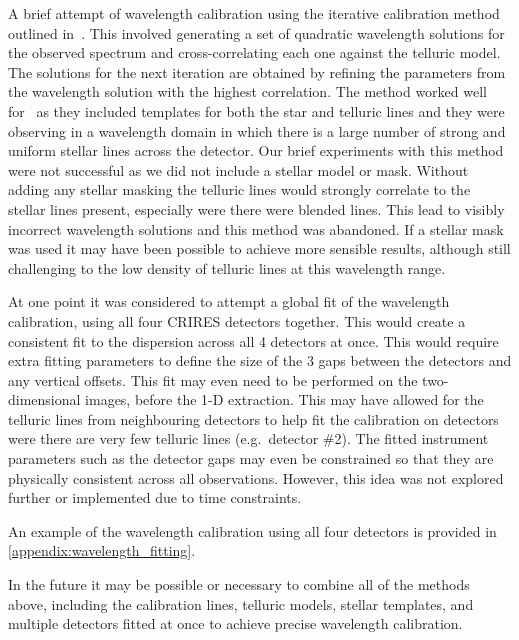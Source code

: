 A brief attempt of wavelength calibration using the iterative calibration method outlined in~\cite{brogi_rotation_2016}.
This involved generating a set of quadratic wavelength solutions for the observed spectrum and cross-correlating each one against the telluric model.
The solutions for the next iteration are obtained by refining the parameters from the wavelength solution with the highest correlation.
The method worked well for~\citet{brogi_rotation_2016} as they included templates for both the star and telluric lines and they were observing in a wavelength domain in which there is a large number of strong and uniform stellar  lines across the detector.
Our brief experiments with this method were not successful as we did not include a stellar model or mask.
Without adding any stellar masking the telluric lines would strongly correlate to the stellar lines present, especially were there were blended lines.
This lead to visibly incorrect wavelength solutions and this method was abandoned.
If a stellar mask was used it may have been possible to achieve more sensible results, although still challenging to the low density of telluric lines at this wavelength range.


At one point it was considered to attempt a global fit of the wavelength calibration, using all four {CRIRES} detectors together.
This would create a consistent fit to the dispersion across all 4 detectors at once.
This would require extra fitting parameters to define the size of the 3 gaps between the detectors and any vertical offsets.
This fit may even need to be performed on the two-dimensional images, before the 1-D extraction.
This may have allowed for the telluric lines from neighbouring detectors to help fit the calibration on detectors were there are very few telluric lines (e.g.\ detector \#2).
The fitted instrument parameters such as the detector gaps may even be constrained so that they are physically consistent across all observations.
However, this idea was not explored further or implemented due to time constraints.


An example of the wavelength calibration using all four detectors is provided in \cref{appendix:wavelength_fitting}.

In the future it may be possible or necessary to combine all of the methods above, including the \thar{} calibration lines, telluric models, stellar templates, and multiple detectors fitted at once to achieve precise wavelength calibration.

